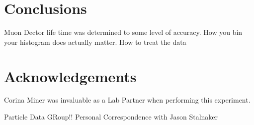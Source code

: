 \documentclass[11pt,letterpaper]{article}
\begin{document}
\section{Conclusions}
Muon Dector life time was determined to some level of accuracy. How you bin your histogram does actually matter. How to treat the data
\section{Acknowledgements}
Corina Miner was invaluable as a Lab Partner when performing this experiment.

\begin{thebibliography}{99}
  Particle Data GRoup!!
 Personal Correspondence with Jason Stalnaker



\end{thebibliography}
\end{document}
